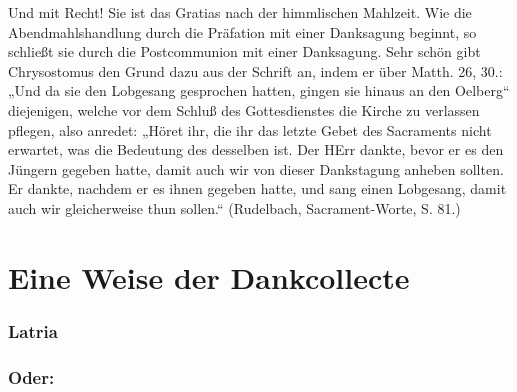 Und mit Recht! Sie ist das Gratias nach der himmlischen Mahlzeit. Wie die Abendmahlshandlung durch die Präfation mit einer Danksagung beginnt, so schließt sie durch die Postcommunion mit einer Danksagung. Sehr schön gibt Chrysostomus den Grund dazu aus der Schrift an, indem er über Matth. 26, 30.: „Und da sie den Lobgesang gesprochen hatten, gingen sie hinaus an den Oelberg“ diejenigen, welche vor dem Schluß des Gottesdienstes die Kirche zu verlassen pflegen, also anredet: „Höret ihr, die ihr das letzte Gebet des Sacraments nicht erwartet, was die Bedeutung des
desselben ist. Der HErr dankte, bevor er es den Jüngern gegeben hatte, damit auch wir von dieser Dankstagung anheben sollten. Er dankte, nachdem er es ihnen gegeben hatte, und sang einen Lobgesang, damit auch wir gleicherweise thun sollen.“ (Rudelbach, Sacrament-Worte, S. 81.)

\section{Eine Weise der Dankcollecte}

\subsubsection{Latria}



\subsubsection{Oder:}





